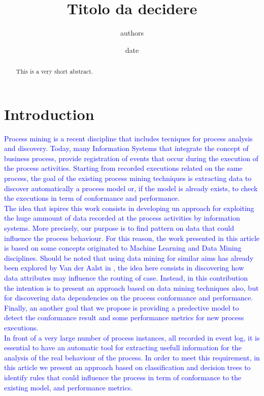 \documentclass[11pt]{article}
\title{Titolo da decidere}
\author{authors}
\date{date}
\begin{document}
\maketitle
\begin{abstract}
This is a very short abstract.
\end{abstract}

\section{Introduction}

\textcolor{blue}{
Process mining is a recent discipline that includes tecniques for process analysis and discovery. Today, many Information Systems that integrate the concept of business process, provide registration of events that occur during the execution of the process activities. Starting from recorded executions related on the same process, the goal of the existing process mining techniques is extracting data to discover automatically a process model or, if the model is already exists, to check the executions in term of conformance and performance.\\
\newline
The idea that ispires this work consists in developing un approach for exploiting the huge ammount of data recorded at the process activities by information systems. More precisely, our purpose is to find pattern on data that could influence the process behaviour. For this reason, the work presented in this article is based on some concepts originated to Machine Learning and Data Mining disciplines. Should be noted that using data mining for similar aims has already been explored by Van der Aalst in \cite{}, the idea here consists in discovering how data attributes may influence the routing of case. Instead, in this contribution the intention is to present an approach based on data mining techniques also, but for discovering data dependencies on the process conformance and performance. Finally, an another goal that we propose is providing a predective model to detect the conformance result and some performance metrics for new process executions.  \\}
\newline
\textcolor{blue}{In front of a very large number of process instances, all recorded in event log, it is essential to have an automatic tool for extracting usefull information for the analysis of the real behaviour of the process. In order to meet this requirement, in this article we present an approach based on classification and decision trees to identify rules that could influence the process in term of conformance to the existing model, and performance metrics.\\}
\end{document}

